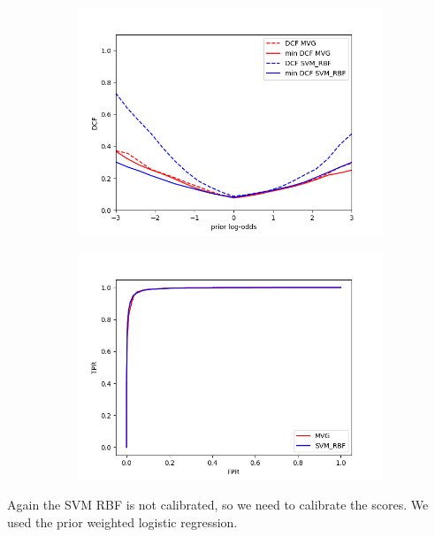 \documentclass[english]{report}
\begin{document}
\begin{figure}[H]
    \begin{subfigure}{0.5\textwidth}
        \includegraphics[scale=0.5]{../../images/comparison/evaluation/DCF_MVG&SVM_RBF}
    \end{subfigure}
    \begin{subfigure}{0.5\textwidth}
        \includegraphics[scale=0.5]{../../images/comparison/evaluation/ROC_MVG&SVM_RBF}
    \end{subfigure}
    \label{fig:eval_MVGvsSVM}
\end{figure}
Again the SVM RBF is not calibrated, so we need to calibrate the scores.
We used the prior weighted logistic regression.
\end{document}
